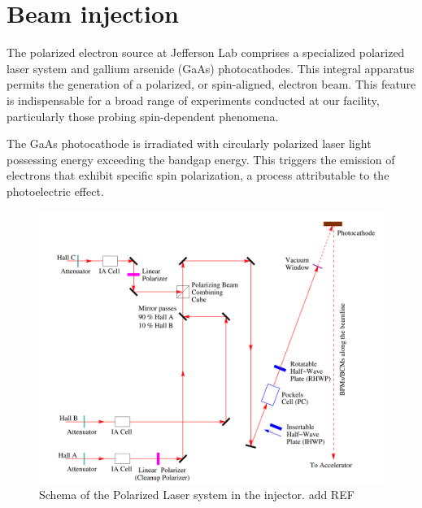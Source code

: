 \section{Beam injection}

The polarized electron source at Jefferson Lab comprises a specialized polarized laser system and gallium arsenide (GaAs) photocathodes. This integral apparatus permits the generation of a polarized, or spin-aligned, electron beam. This feature is indispensable for a broad range of experiments conducted at our facility, particularly those probing spin-dependent phenomena.

The GaAs photocathode is irradiated with circularly polarized laser light possessing energy exceeding the bandgap energy. This triggers the emission of electrons that exhibit specific spin polarization, a process attributable to the photoelectric effect.

\begin{figure}[!htbp]
    \centering
    \includegraphics[width=\textwidth]{images/chap3/jlab_polarized_source.png}
    \caption{Schema of the Polarized Laser system in the injector. add REF}
    \label{fig:cebaf_polarize_laser_system}
\end{figure}
